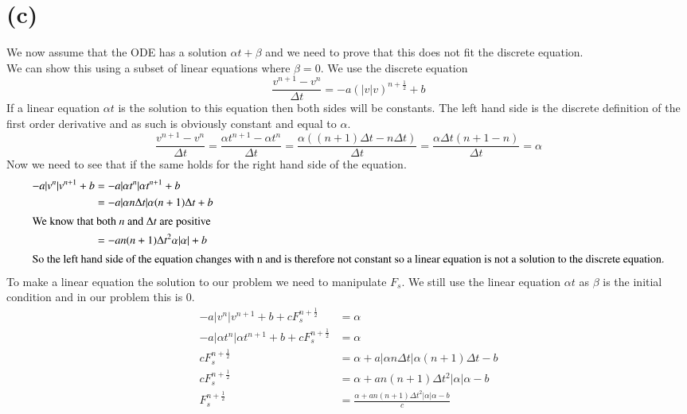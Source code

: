 \documentclass[12pt, norsk, a4paper]{article}
\begin{document}
\section*{(c)}
We now assume that the ODE has a solution $\alpha t + \beta$ and we need to
prove that this does not fit the discrete equation. \\
We can show this using a subset of linear equations where $\beta=0$.
We use the discrete equation 
\[\frac{v^{n+1}-v^n}{\Delta t} = -a (|v|v)^{n+\frac{1}{2}} + b \]
If a linear equation $\alpha t$ is the solution to this equation then both
sides will be constants. The left hand side is the discrete definition of the
first order derivative and as such is obviously constant and equal to $\alpha$.
\[\frac{v^{n+1}-v^n}{\Delta t} = \frac{\alpha t^{n+1}-\alpha t^n}{\Delta t} =
\frac{\alpha((n+1)\Delta t - n \Delta t)}{\Delta t} = \frac{\alpha \Delta t
    (n+1-n)}{\Delta t} = \alpha \]
Now we need to see that if the same holds for the right hand side of the
equation.
\begin{align*}
-a |v^n|v^{n+1} + b &= -a |\alpha t^n|\alpha t^{n+1} + b \\
        &= -a |\alpha n \Delta t|\alpha (n+1) \Delta t + b \\
\intertext{We know that both $n$ and $\Delta t$ are positive}
&= -a n(n+1) \Delta t^2 \alpha |\alpha| + b \\
\intertext{So the left hand side of the equation changes with n and is
    therefore not constant so a linear equation is not a solution to the
        discrete equation.}
\end{align*}
To make a linear equation the solution to our problem we need to manipulate
$F_s$. We still use the linear equation $\alpha t$ as $\beta$ is the initial
condition and in our problem this is 0. 
\begin{align*}
-a |v^n|v^{n+1} + b + cF_s^{n+\frac{1}{2}} & = \alpha \\
-a |\alpha t^n|\alpha t^{n+1} + b + cF_s^{n+\frac{1}{2}} &= \alpha \\
cF_s^{n+\frac{1}{2}} &= \alpha + a |\alpha n \Delta t|\alpha (n+1) \Delta t - b
\\
cF_s^{n+\frac{1}{2}} &= \alpha + a n(n+1)\Delta t^2 |\alpha| \alpha -b \\
F_s^{n+\frac{1}{2}} &= \frac{\alpha + a n(n+1)\Delta t^2 |\alpha| \alpha -b }{c}
\end{align*}
\end{document}
